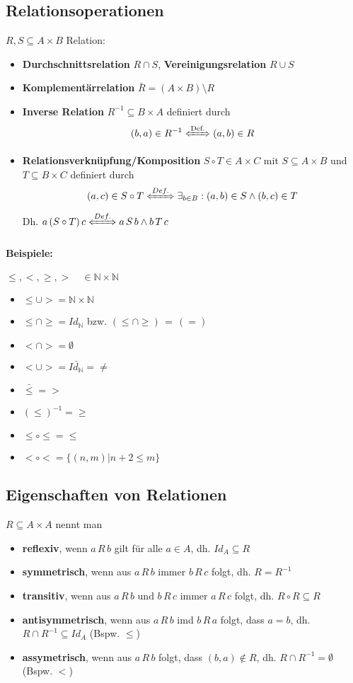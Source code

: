 \subsection{Relationsoperationen}
$R,S\subseteq A\times B$ Relation:
\begin{itemize}
\item \textbf{Durchschnittsrelation} $R\cap S$, \textbf{Vereinigungsrelation} $R\cup S$
\item \textbf{Komplementärrelation} $\bar{R}=(A\times B)\setminus R$
\item \textbf{Inverse Relation} $R^{-1}\subseteq B\times A$ definiert durch
\[
(b,a)\in R^{-1} \xLeftrightarrow{\text{Def.}} (a,b)\in R
\]
\item \textbf{Relationsverknüpfung/Komposition} $S\circ T\in A\times C$ mit $S\subseteq A\times B$ und $T\subseteq B\times C$ definiert durch
\[
(a,c)\in S\circ T \xLeftrightarrow{Def.}\exists_{b\in B}: (a,b)\in S \land (b,c)\in T
\]
Dh. $a\, (S\circ T)\, c \xLeftrightarrow{Def.} a\,S\,b \land b\,T\,c$
\end{itemize}

\paragraph{Beispiele:} $\leq,<,\geq,>\quad\in \mathbb{N}\times\mathbb{N}$
\begin{itemize}
\item $\leq\cup > = \mathbb{N}\times\mathbb{N}$
\item $\leq\cap\geq= Id_\mathbb{N}$ bzw. \glqq $(\leq \cap \geq) \,=\, (=)$\grqq 
\item $<\cap > = \emptyset$
\item $<\cup > = \bar{Id_\mathbb{N}} = \neq$
\item $\bar{\leq} = >$
\item $(\leq)^{-1} = \geq $
\item $\leq\circ\leq = \leq$
\item $< \circ < = \{(n,m) | n+2\leq m\}$
\end{itemize}

\subsection{Eigenschaften von Relationen}
$R\subseteq A\times A$ nennt man
\begin{itemize}
\item \textbf{reflexiv}, wenn $a\,R\,b$ gilt für alle $a\in A$, dh. $Id_A \subseteq R$
\item \textbf{symmetrisch}, wenn aus $a\,R\,b$ immer $b\,R\,c$ folgt, dh. $R=R^{-1}$
\item \textbf{transitiv}, wenn aus $a\,R\,b$ und $b\,R\,c$ immer $a\,R\,c$ folgt, dh. $R\circ R\subseteq R$
\item \textbf{antisymmetrisch}, wenn aus $a\,R\,b$ imd $b\,R\,a$ folgt, dass $a=b$, dh. $R\cap R^{-1}\subseteq Id_A$ (Bspw. $\leq$)
\item \textbf{assymetrisch}, wenn aus $a\,R\,b$ folgt, dass $(b,a)\notin R$, dh. $R\cap R^{-1}=\emptyset$ (Bspw. $<$)
\end{itemize}
%
